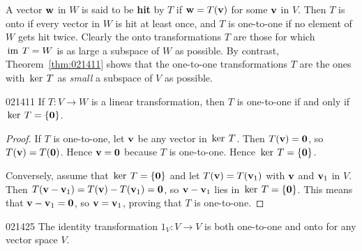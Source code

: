 A vector $\textbf{w}$ in $W$ is said to be \textbf{hit} by $T$ if $\textbf{w} = T(\textbf{v})$ for some $\textbf{v}$ in $V$. Then $T$ is onto if every vector in $W$ is hit at least once, and $T$ is one-to-one if no element of $W$ gets hit twice. Clearly the onto transformations $T$ are those for which $\thinspace\operatorname{im \medspace}T = W$ is as large a subspace of $W$ as possible. By contrast, Theorem~\ref{thm:021411} shows that the one-to-one transformations $T$ are the ones with $\thinspace\operatorname{ker \medspace}T$ as \textit{small} a subspace of $V$ as possible.


\begin{theorem}{}{021411}
If $T : V \to W$ is a linear transformation, then $T$ is one-to-one if and only if $\thinspace\operatorname{ker \medspace}T = \{\textbf{0}\}$.
\end{theorem}

\begin{proof}
If $T$ is one-to-one, let $\textbf{v}$ be any vector in $\thinspace\operatorname{ker \medspace}T$. Then $T(\textbf{v}) = \textbf{0}$, so $T(\textbf{v}) = T(\textbf{0})$. Hence $\textbf{v} = \textbf{0}$ because $T$ is one-to-one. Hence $\thinspace\operatorname{ker \medspace}T = \{\textbf{0}\}$.


Conversely, assume that $\thinspace\operatorname{ker \medspace}T = \{\textbf{0}\}$ and let $T(\textbf{v}) = T(\textbf{v}_{1})$ with $\textbf{v}$ and $\textbf{v}_{1}$ in $V$. Then \newline $T(\textbf{v} - \textbf{v}_{1}) = T(\textbf{v}) - T(\textbf{v}_{1}) = \textbf{0}$, so $\textbf{v} - \textbf{v}_{1}$ lies in $\thinspace\operatorname{ker \medspace}T = \{\textbf{0}\}$. This means that $\textbf{v} - \textbf{v}_{1} = \textbf{0}$, so $\textbf{v} = \textbf{v}_{1}$, proving that $T$ is one-to-one.
\end{proof}

\begin{example}{}{021425}
The identity transformation $1_{V} : V \to V$ is both one-to-one and onto for any vector space $V$.
\end{example}

